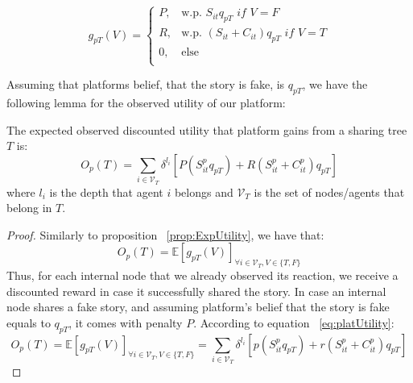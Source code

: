 \begin{equation}
g_{pT} (V) = 
\begin{cases}
P, & \text{w.p. } S_{it}q_{pT} \textit{ if } V=F \\
R, & \text{w.p. } (S_{it}+C_{it})q_{pT} \textit{ if } V=T\\
0, & \text{else} \\
\end{cases}
\label{eq:platUtility}
\end{equation}

Assuming that platforms belief, that the story is fake, is $q_{pT}$, we have the following lemma for the observed utility of our platform:

\begin{lemma}
	The expected observed discounted utility that platform gains from a sharing tree $T$ is:
	$$ O_{p}(T) = \sum_{i \in \mathcal{V}_{T}}  \delta^{l_i} \left[ P ( S_{it}^p q_{pT} ) + R ( S_{it}^p+C_{it}^p)q_{pT}  \right]$$ where $l_i$ is the depth that agent $i$ belongs and $\mathcal{V}_{T}$ is the set of nodes/agents that belong in $T$.
\end{lemma} 

\begin{proof}
	Similarly to proposition ~\ref{prop:ExpUtility}, we have that:
	$$ O_{p}(T) =  \mathbb{E} [g_{pT} (V)]_{\forall i \in \mathcal{V}_{T}, V \in \{T,F \}}  $$
	Thus, for each internal node that we already observed its reaction, we receive a discounted reward in case it successfully shared the story. In case an internal node shares a fake story, and assuming platform's belief that the story is fake equals to $q_{pT}$, it comes with penalty $P$. According to equation ~\ref{eq:platUtility}:
	$$ O_{p}(T) =  \mathbb{E} [g_{pT} (V)]_{\forall i \in \mathcal{V}_{T}, V \in \{T,F \}} = \sum_{i \in \mathcal{V}_{T}}  \delta^{l_i} \left[ p ( S_{it}^p q_{pT} ) + r ( S_{it}^p+C_{it}^p)q_{pT}  \right]$$
	 
\end{proof}


